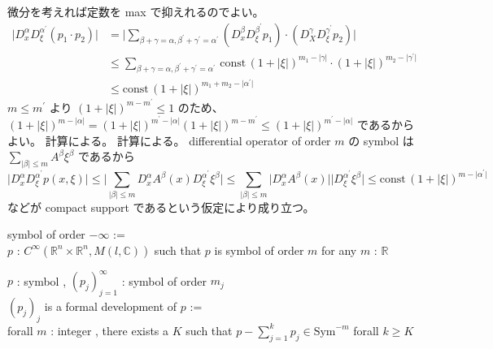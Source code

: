 \begin{Proof}
\itemprof
  微分を考えれば定数を max で抑えれるのでよい。
\itemprof
  \begin{align*}
    \lvert D^\alpha_x D^{\alpha^\prime}_\xi (p_1 \cdot p_2) \rvert
    &= \lvert \sum_{\beta + \gamma = \alpha , \beta^\prime + \gamma^\prime = \alpha^\prime} (D^\beta_x D^{\beta^\prime}_\xi p_1) \cdot (D^\gamma_X D^{\gamma^\prime}_\xi p_2) \rvert \\
    &\leq \sum_{\beta + \gamma = \alpha , \beta^\prime + \gamma^\prime = \alpha^\prime} \, \text{const} \, (1 + \lvert \xi \rvert)^{m_1 - \lvert \gamma \rvert} \cdot (1 + \lvert \xi \rvert)^{m_2 - \lvert \gamma^\prime \rvert} \\
    &\leq \text{const} \, (1 + \lvert \xi \rvert)^{m_1 + m_2 - \lvert \alpha^\prime \rvert}
  \end{align*}
\itemprof
  \(m \leq m^{\prime}\) より \((1 + \lvert \xi \rvert)^{m - m^{\prime}} \leq 1\) のため、 \((1 + \lvert \xi \rvert)^{m - \lvert \alpha \rvert} = (1 + \lvert \xi \rvert)^{m^{\prime} - \lvert \alpha \rvert} (1 + \lvert \xi \rvert)^{m - m^{\prime}} \leq (1 + \lvert \xi \rvert)^{m^{\prime} - \lvert \alpha \rvert}\) であるからよい。
\itemprof
  計算による。
\itemprof
  計算による。
\itemprof
  differential operator of order \(m\) の symbol は \(\sum_{\lvert \beta \rvert \leq m} A^\beta \xi^\beta\) であるから
  \[
    \lvert D^\alpha_{x} D^{\alpha^\prime}_{\xi} p(x,\xi) \rvert 
    \leq \lvert \sum_{\lvert \beta \rvert \leq m} D^\alpha_{x} A^\beta(x) D^{\alpha^\prime}_{\xi} \xi^\beta \rvert
    \leq \sum_{\lvert \beta \rvert \leq m} \lvert D^\alpha_{x} A^\beta(x) \rvert \lvert D^{\alpha^\prime}_{\xi} \xi^\beta \rvert
    \leq \text{const} \, (1 + \lvert \xi \rvert)^{m - \lvert \alpha^\prime \rvert}
  \]
  などが compact support であるという仮定により成り立つ。
\end{Proof}

\begin{Definition}
\itemdefi
  \Define symbol of order \(- \infty\) := \\
  \(p\) : \(C^\infty(\mathbb{R}^n \times \mathbb{R}^n , M(l , \mathbb{C}))\) such that \(p\) is symbol of order \(m\) for any \(m\) : \(\mathbb{R}\)
\end{Definition}

\begin{Definition}
\itemdefi
  \For \(p\) : symbol , \((p_j)_{j=1}^{\infty}\) : symbol of order \(m_j\) \\
  \Define \((p_j)_j\) is a formal development of \(p\) := \\
  forall \(m\) : integer , there exists a \(K\) such that \(p-\sum_{j=1}^k p_j \in \text{Sym}^{-m}\) forall \(k \geq K\)
\end{Definition}

